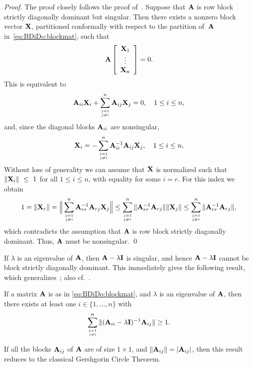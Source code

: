 \emph{Proof.}
The proof closely follows the proof of~\cite[Theorem~1]{FeiVar62}. Suppose that
$\mathbf{A}$ is row block strictly diagonally dominant but singular. Then there exists a
nonzero block vector $\mathbf{X}$, partitioned conformally with respect to the partition
of~$\mathbf{A}$ in~\eqref{eq:BDiDo:blockmat}, such that
\[
\mathbf{A}\left[\begin{array}{c}\mathbf{X}_1\\\vdots\\\mathbf{X}_n\end{array}\right]=0.
\]
This is equivalent to
\[
\A_{ii}\X_i+\sum_{\atopfrac{j=1}{j\neq i}}^{n} \A_{ij}\X_j=0,\quad 1\leq i \leq n,
\]
and, since the diagonal blocks $\mathbf{A}_{ii}$ are nonsingular,
%
\[
\X_i=-\sum_{\atopfrac{j=1}{j\neq i}}^{n} \A_{ii}^{-1}\A_{ij}\X_j,\quad 1\leq i \leq n,
\]
%
Without loss of generality we can assume that $\mathbf{X}$ is normalized such that
$\|\mathbf{X}_i\|~\leq~1$ for all $1\leq i \leq n$, with equality for some $i=r$. For
this index we obtain
%
\[
1=\|\X_r\|=\Big\|\sum_{\atopfrac{j=1}{j\neq i}}^{n} \A_{rr}^{-1}\A_{rj}\X_j\Big\|\leq \sum_{\atopfrac{j=1}{j\neq r}}^{n}
\|\A_{rr}^{-1}\A_{rj}\|\|\X_j\|\leq \sum_{\atopfrac{j=1}{j\neq r}}^{n} \|\A_{rr}^{-1}\A_{rj}\|,
\]
%
which contradicts the assumption that $\mathbf{A}$ is row block strictly diagonally
dominant. Thus, $\mathbf{A}$ must be nonsingular. \qed

If $\lambda$ is an eigenvalue of $\mathbf{A}$, then $\mathbf{A}-\lambda \mathbf{I}$ is singular, and
hence $\mathbf{A}-\lambda \mathbf{I}$ cannot be block strictly diagonally dominant. This
immediately gives the following result, which
generalizes~\cite[Theorem~2]{FeiVar62}; also cf.~\cite[Theorem~6.3]{Var11}.

\begin{cor}\label{cor:BDiDo:inclusion}
If a matrix $\mathbf{A}$ is as in \eqref{eq:BDiDo:blockmat}, and $\lambda$ is an
eigenvalue of $\mathbf{A}$, then there exists at least one $i\in\{1,\dots,n\}$ with
\begin{equation}\label{eq:BDiDo:evals}
\sum_{\atopfrac{j=1}{j\neq i}}^{n} \| (\A_{ii}-\lambda \I)^{-1} \A_{ij} \|\geq 1.
\end{equation}
%
\end{cor}

If all the blocks $\mathbf{A}_{ij}$ of $\mathbf{A}$  are of size $1\times 1$, and
$\|\mathbf{A}_{ij}\|=|\mathbf{A}_{ij}|$, then this result reduces to the classical Gershgorin
Circle Theorem.

